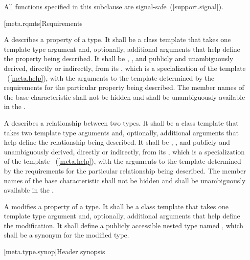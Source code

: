\pnum
{}%
All functions specified in this subclause are signal-safe~(\ref{support.signal}).

[meta.rqmts]{Requirements}

\pnum
A  describes a property
of a type. It shall be a class template that takes one template type
argument and, optionally, additional arguments that help define the
property being described. It shall be ,
,
and publicly and unambiguously derived, directly or indirectly, from
its , which is
a specialization of the template
~(\ref{meta.help}), with
the arguments to the template  determined by the
requirements for the particular property being described.
The member names of the base characteristic shall not be hidden and shall be
unambiguously available in the .

\pnum
A  describes a
relationship between two types. It shall be a class template that
takes two template type arguments and, optionally, additional
arguments that help define the relationship being described. It shall
be , ,
and publicly and unambiguously derived, directly or
indirectly, from
its , which is a specialization
of the template
~(\ref{meta.help}), with
the arguments to the template  determined by the
requirements for the particular relationship being described.
The member names of the base characteristic shall not be hidden and shall be
unambiguously available in the .

\pnum
A 
modifies a property
of a type. It shall be a class template that takes one
template type argument and, optionally, additional arguments that help
define the modification. It shall define a publicly accessible nested type
named , which shall be a synonym for the modified type.

[meta.type.synop]{Header  synopsis}

